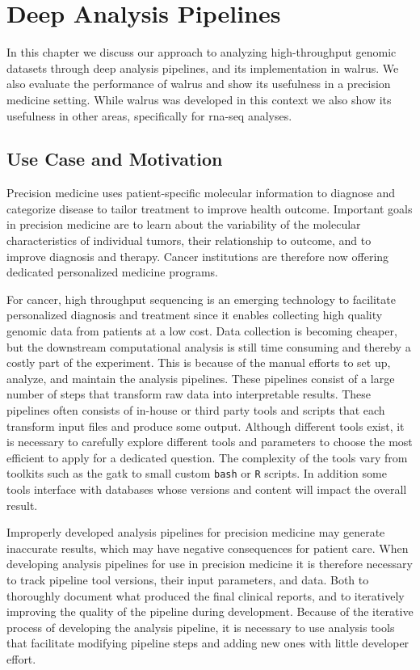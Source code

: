 \chapter{Deep Analysis Pipelines}\label{pipeline}  
In this chapter we discuss our approach to analyzing high-throughput genomic
datasets through deep analysis pipelines, and its implementation in 
walrus.\cite{walrus} We also evaluate the performance of walrus and show its
usefulness in a precision medicine setting. While walrus was developed in this
context we also show its usefulness in other areas, specifically for
\gls{rna}-seq analyses. 

\section{Use Case and Motivation} 
Precision medicine uses patient-specific molecular information to diagnose and
categorize disease to tailor treatment to improve health
outcome.\cite{national2011toward} Important goals in precision medicine are to
learn about the variability of the molecular characteristics of individual
tumors, their relationship to outcome, and to improve diagnosis and
therapy.\cite{tannock2016limits} Cancer institutions are therefore now
offering dedicated personalized medicine programs. 

For cancer, high throughput sequencing is an emerging technology to facilitate
personalized diagnosis and treatment since it enables collecting high quality
genomic data from patients at a low cost. Data collection is becoming cheaper,
but the downstream computational analysis is still time consuming and thereby a
costly part of the experiment.  This is because of the manual efforts to set up,
analyze, and maintain the analysis pipelines. These pipelines consist of a large
number of steps that transform raw data into interpretable
results.\cite{diao2015building} These pipelines often consists of in-house or
third party tools and scripts that each transform input files and produce some
output. Although different tools exist, it is necessary to carefully explore
different tools and parameters to choose the most efficient to apply for a
dedicated question.\cite{servant2014bioinformatics} The complexity of the tools
vary from toolkits such as the \gls{gatk} to small custom \texttt{bash} or
\texttt{R} scripts.  In addition some tools interface with databases whose
versions and content will impact the overall result.\cite{sboner2015primer}

Improperly developed analysis pipelines for precision medicine may generate
inaccurate results, which may have negative consequences for patient
care.\cite{roy2017standards} 
When developing analysis pipelines for use in precision medicine it is therefore
necessary to track pipeline tool versions, their input parameters, and data.
Both to thoroughly document what produced the final clinical reports, and
to iteratively improving the quality of the pipeline during development.
Because of the iterative process of developing the analysis pipeline, it is
necessary to use analysis tools that facilitate modifying pipeline steps and
adding new ones with little developer effort.

